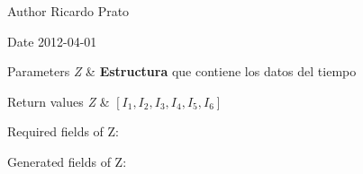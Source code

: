 \begin{DoxyAuthor}{Author}
Ricardo Prato 
\end{DoxyAuthor}
\begin{DoxyDate}{Date}
2012-\/04-\/01
\end{DoxyDate}

\begin{DoxyParams}{Parameters}
{\em Z} & {\bfseries Estructura} que contiene los datos del tiempo\\
\hline
\end{DoxyParams}

\begin{DoxyRetVals}{Return values}
{\em Z} & $[I_1,I_2,I_3,I_4,I_5,I_6]$\\
\hline
\end{DoxyRetVals}
\begin{DoxyParagraph}{Required fields of Z\-:}

\end{DoxyParagraph}
\begin{DoxyParagraph}{Generated fields of Z\-:}

\end{DoxyParagraph}
